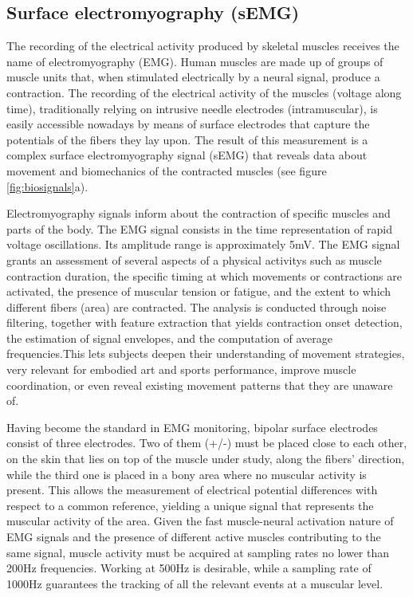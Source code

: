 \subsection{Surface electromyography (sEMG)}
The recording of the electrical activity produced by skeletal muscles receives the name of electromyography (EMG). Human muscles are made up of groups of muscle units that, when stimulated electrically by a neural signal, produce a contraction. The recording of the electrical activity of the muscles (voltage along time), traditionally relying on intrusive needle electrodes (intramuscular), is easily accessible nowadays by means of surface electrodes that capture the potentials of the fibers they lay upon. The result of this measurement is a complex surface electromyography signal (sEMG) that reveals data about movement and biomechanics of the contracted muscles (see figure \ref{fig:biosignals}a). 

Electromyography signals inform about the contraction of specific muscles and parts of the body. The EMG signal consists in the time representation of rapid voltage oscillations. Its amplitude range is approximately 5mV. The EMG signal grants an assessment of several aspects of a physical activitys such as muscle contraction duration, the specific timing at which movements or contractions are activated, the presence of muscular tension or fatigue, and the extent to which different fibers (area) are contracted. The analysis is conducted through noise filtering, together with feature extraction that yields contraction onset detection, the estimation of signal envelopes, and the computation of average frequencies.This lets subjects deepen their understanding of movement strategies, very relevant for embodied art and sports performance, improve muscle coordination, or even reveal existing movement patterns that they are unaware of.


Having become the standard in EMG monitoring, bipolar surface electrodes consist of three electrodes. Two of them (+/-) must be placed close to each other, on the skin that lies on top of the muscle under study, along the fibers' direction, while the third one is placed in a bony area where no muscular activity is present. This allows the measurement of electrical potential differences with respect to a common reference, yielding a unique signal that represents the muscular activity of the area. Given the fast muscle-neural activation nature of EMG signals and the presence of different active muscles contributing to the same signal, muscle activity must be acquired at sampling rates no lower than 200Hz frequencies. Working at 500Hz is desirable, while a sampling rate of 1000Hz guarantees the tracking of all the relevant events at a muscular level.

